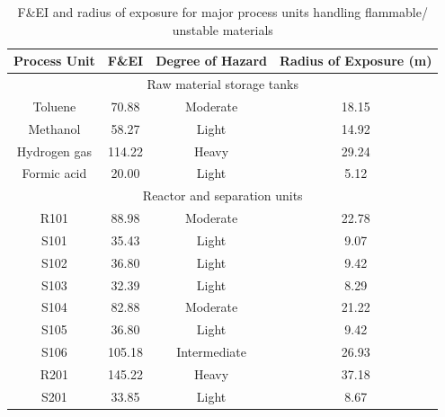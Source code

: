 \begin{table}[H]
\centering
\caption{F\&EI and radius of exposure for major process units handling flammable/ unstable materials}
\label{tab:radius}
\begin{tabular}{cccc}
\toprule\textbf{Process   Unit} & \textbf{F\&EI} & \textbf{Degree of Hazard} & \textbf{Radius of   Exposure (m)} \\\bottomrule
\multicolumn{4}{c}{Raw   material storage tanks}   
\\\hline
Toluene                 & 70.88         & Moderate                  & 18.15                             \\
Methanol                & 58.27          & Light                  & 14.92                              \\
Hydrogen gas            & 114.22         & Heavy                     & 29.24                              \\
Formic acid             & 20.00          & Light                     & 5.12                               \\\hline
\multicolumn{4}{c}{Reactor and separation units}                                                        \\\hline
R101                    & 88.98          & Moderate                  & 22.78                              \\
S101                    & 35.43          & Light                     & 9.07                               \\
S102                    & 36.80          & Light                     & 9.42                               \\
S103                    & 32.39          & Light                     & 8.29                               \\
S104                    & 82.88          & Moderate                  & 21.22                              \\
S105                    & 36.80          & Light                     & 9.42                               \\
S106                    & 105.18         & Intermediate              & 26.93                              \\
R201                    & 145.22         & Heavy                     & 37.18                              \\
S201                    & 33.85          & Light                     & 8.67                               \\

\end{tabular}
\end{table}
